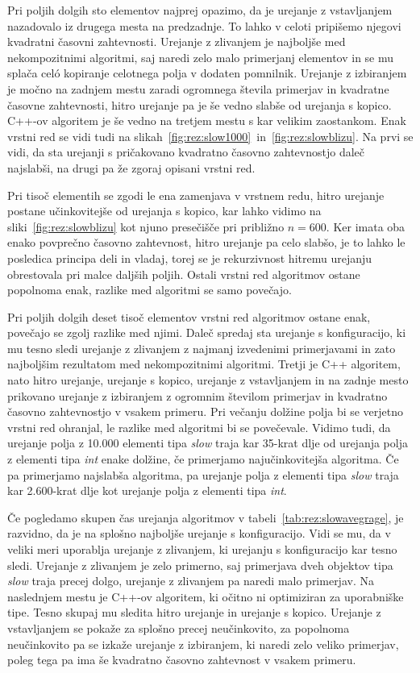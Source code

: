 \documentclass[a4paper,oneside,12pt]{article}
\begin{document}
Pri poljih dolgih sto elementov najprej opazimo, da je urejanje z vstavljanjem
nazadovalo iz drugega mesta na predzadnje. To lahko v celoti pripišemo njegovi
kvadratni časovni zahtevnosti. Urejanje z zlivanjem je najboljše med
nekompozitnimi algoritmi, saj naredi zelo malo primerjanj elementov in se mu
splača cel\'{o} kopiranje celotnega polja v dodaten pomnilnik. Urejanje z
izbiranjem je močno na zadnjem mestu zaradi ogromnega števila primerjav in
kvadratne časovne zahtevnosti, hitro urejanje pa je še vedno slabše od urejanja s
kopico. \mbox{C++-ov} algoritem je še vedno na tretjem mestu s kar velikim zaostankom.
Enak vrstni red se vidi tudi na
slikah~\ref{fig:rez:slow1000}~in~\ref{fig:rez:slowblizu}. Na prvi se vidi, da
sta urejanji s pričakovano kvadratno časovno zahtevnostjo daleč najslabši, na
drugi pa že zgoraj opisani vrstni red.

Pri tisoč elementih se zgodi le ena zamenjava v vrstnem redu, hitro urejanje
postane učinkovitejše od urejanja s kopico, kar lahko vidimo na
sliki~\ref{fig:rez:slowblizu} kot njuno presečišče pri približno $n = 600$.
Ker imata oba enako povprečno časovno zahtevnost, hitro urejanje pa celo slabšo, je to lahko le posledica
principa deli in vladaj, torej se je rekurzivnost hitremu urejanju obrestovala
pri malce daljših poljih. Ostali vrstni red algoritmov ostane popolnoma enak,
razlike med algoritmi se samo povečajo.

Pri poljih dolgih deset tisoč elementov vrstni red algoritmov ostane enak,
povečajo se zgolj razlike med njimi. Daleč spredaj sta urejanje s konfiguracijo,
ki mu tesno sledi urejanje z zlivanjem z najmanj izvedenimi primerjavami in zato najboljšim
rezultatom med nekompozitnimi algoritmi. Tretji je C++ algoritem, nato hitro urejanje,
urejanje s kopico, urejanje z vstavljanjem in na zadnje mesto prikovano urejanje z izbiranjem z
ogromnim številom primerjav in kvadratno časovno zahtevnostjo v vsakem primeru.
Pri večanju dolžine polja bi se verjetno vrstni red ohranjal, le razlike med
algoritmi bi se povečevale. Vidimo tudi, da urejanje polja z 10.000 elementi
tipa \emph{slow} traja kar 35-krat dlje od urejanja polja z elementi tipa
\emph{int} enake dolžine, če primerjamo najučinkovitejša algoritma. Če pa
primerjamo najslabša algoritma, pa urejanje polja z elementi tipa \emph{slow}
traja kar 2.600-krat dlje kot urejanje polja z elementi tipa \emph{int}.

Če pogledamo skupen čas urejanja algoritmov v tabeli~\ref{tab:rez:slowavegrage},
je razvidno, da je na splošno najboljše urejanje s konfiguracijo. Vidi se mu,
da v veliki meri
uporablja urejanje z zlivanjem, ki urejanju s konfiguracijo kar tesno sledi. 
Urejanje z zlivanjem je zelo primerno, saj primerjava dveh objektov tipa
\emph{slow} traja precej dolgo, urejanje z zlivanjem pa naredi malo primerjav.
Na naslednjem mestu  je \mbox{C++-ov}  algoritem, ki očitno ni optimiziran za 
uporabniške tipe. Tesno skupaj mu sledita
hitro urejanje in urejanje s kopico. Urejanje z vstavljanjem se pokaže za
splošno precej neučinkovito, za popolnoma neučinkovito pa se izkaže urejanje z
izbiranjem, ki naredi zelo veliko primerjav, poleg tega pa ima še kvadratno
časovno zahtevnost v vsakem primeru.
\end{document}
